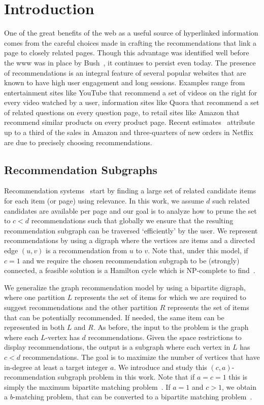 
\section{Introduction}

One of the great benefits of the web as a useful source of hyperlinked
information comes from the careful choices made in crafting the
recommendations that link a page to closely related pages. Though this
advantage was identified well before the www was in place by
Bush~\cite{Bush45aswe}, it continues to persist even today. The
presence of recommendations is an integral feature of several popular
websites that are known to have high user engagement and long
sessions. Examples range from entertainment sites like YouTube that
recommend a set of videos on the right for every video watched by a
user, information sites like Quora that recommend a set of related
questions on every question page, to retail sites like Amazon that
recommend similar products on every product page. Recent
estimates~\cite{big-data-book13} attribute up to a third of the sales
in Amazon and three-quarters of new orders in Netflix are due to precisely choosing recommendations.

\subsection{Recommendation Subgraphs}
Recommendation systems~\cite{Schafer1999, Adomavicius2005,
  Resnick1997} start by finding a large set of related candidate items
for each item (or page) using relevance. In this work, we assume $d$
such related candidates are available per page and our goal is to
analyze how to prune the set to $c < d$ recommendations such that
globally we ensure that the resulting recommendation subgraph can be traversed
`efficiently' by the user. We represent recommendations
by using a digraph where the vertices are items and a directed
edge $(u, v)$ is a recommendation from $u$ to $v$. Note that, under
this model, if $c=1$ and we require the chosen recommendation subgraph
to be (strongly) connected, a feasible solution is a Hamilton cycle
which is NP-complete to find~\cite{CLRS2001}. 

We generalize the graph recommendation model by using a bipartite
digraph, where one partition $L$ represents the set of items for which
we are required to suggest recommendations and the other partition $R$
represents the set of items that can be potentially recommended. If
needed, the same item can be represented in both $L$ and $R$.  As
before, the input to the problem is the graph where each
$L$-vertex has $d$ recommendations. Given the space restrictions to
display recommendations, the output is a subgraph where each vertex in
$L$ has $c < d$ recommendations. The goal is to maximize the number of
vertices that have in-degree at least a target integer $a$. We
introduce and study this $(c, a)$-recommendation subgraph problem in
this work.  Note that if $a=c=1$ this is simply the maximum bipartite
matching problem~\cite{LovaszPlummer1986}. If $a=1$ and $c > 1$, we
obtain a $b$-matching problem, that can be converted to a bipartite
matching problem~\cite{Gabow1983}.\vs

